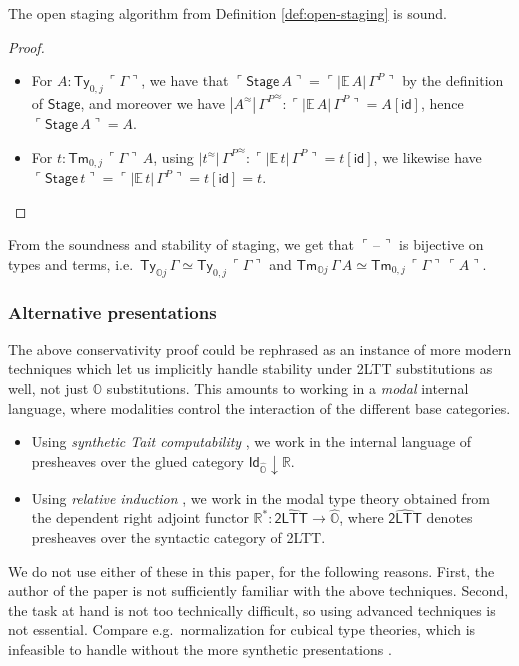 \documentclass[acmsmall]{acmart}
\newcommand{\msf}[1]{\mathsf{#1}}
\newcommand{\mbb}[1]{\mathbb{#1}}
\newcommand{\wh}[1]{\widehat{#1}}
\newcommand{\mbbo}{\mbb{O}}
\newcommand{\Ty}{\msf{Ty}}
\newcommand{\Tm}{\msf{Tm}}
\newcommand{\id}{\msf{id}}
\newcommand{\blank}{{\mathord{\hspace{1pt}\text{--}\hspace{1pt}}}}
\newcommand{\emb}[1]{\ulcorner#1\urcorner}
\newcommand{\Stage}{\msf{Stage}}
\newcommand{\hato}{\bm\hat{\mbbo}}
\newcommand{\ev}{\mbb{E}}
\newcommand{\re}{\mbb{R}}
\theoremstyle{remark}
\newcommand{\rel}{^{\approx}}
\begin{document}
\begin{theorem}
The open staging algorithm from Definition \ref{def:open-staging} is sound.
\end{theorem}
\begin{proof}
\mbox{}
\begin{itemize}
\item For $A : \Ty_{0,j}\,\emb{\Gamma}$, we have that $\emb{\Stage\,A} =
\emb{|\ev\,A|\,\Gamma^P}$ by the definition of $\Stage$, and moreover we have
$|A\rel|\,{\Gamma^P}\rel : \emb{|\ev\,A|\,\Gamma^P} = A[\id]$, hence $\emb{\Stage\,A} = A$.

\item For $t : \Tm_{0,j}\,\emb{\Gamma}\,A$, using $|t\rel|\,{\Gamma^P}\rel : \emb{|\ev\,t|\,\Gamma^P} = t[\id]$, we likewise
  have $\emb{\Stage\,t} = \emb{|\ev\,t|\,\Gamma^P} = t[\id] = t$.
\end{itemize}
\end{proof}

\begin{corollary}\label{conservativity}
From the soundness and stability of staging, we get that $\emb{\blank}$ is
bijective on types and terms, i.e.\ $\Ty_{\mbbo j}\,\Gamma \simeq \Ty_{0,j}\,\emb{\Gamma}$ and
$\Tm_{\mbbo j}\,\Gamma\,A \simeq \Tm_{0,j}\,\emb{\Gamma}\,\emb{A}$.
\end{corollary}

\subsubsection{Alternative presentations}
The above conservativity proof could be rephrased as an instance of more modern
techniques which let us implicitly handle stability under 2LTT substitutions as
well, not just $\mbbo$ substitutions. This amounts to working in a \emph{modal}
internal language, where modalities control the interaction of the different base
categories.
\begin{itemize}
\item Using \emph{synthetic Tait computability} \cite{sterlingthesis}, we work in the internal language
      of presheaves over the glued category $\msf{Id}_{\hato}\downarrow \re$.
\item Using \emph{relative induction} \cite{bocquet2021relative}, we work in the modal type theory
      obtained from the dependent right adjoint functor $\re^* : \wh{\msf{2LTT}} \to \hato$,
      where $\wh{\msf{2LTT}}$ denotes presheaves over the syntactic category of 2LTT.
\end{itemize}
We do not use either of these in this paper, for the following reasons. First,
the author of the paper is not sufficiently familiar with the above
techniques. Second, the task at hand is not too technically difficult, so using
advanced techniques is not essential. Compare e.g.\ normalization for cubical
type theories, which is infeasible to handle without the more synthetic
presentations \cite{cubicalnbe}.
\end{document}

